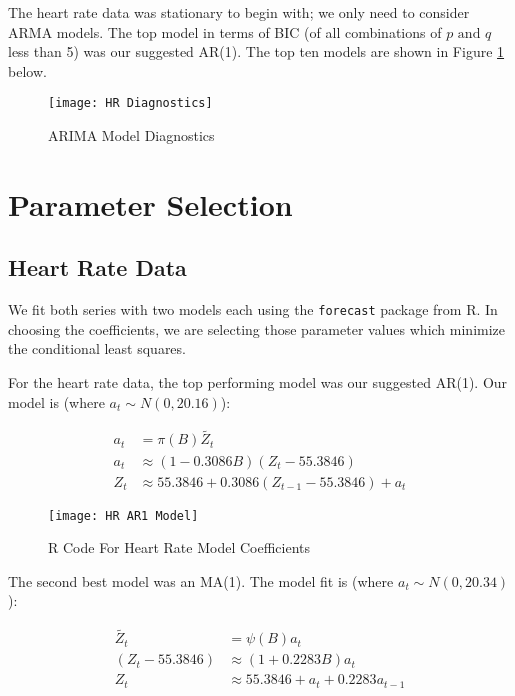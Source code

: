 \documentclass[12pt, letterpaper]{article}
\theoremstyle{definition}
\numberwithin{equation}{section}
\newcommand{\+}[1]{+_{\scalebox{.375}{#1}}}
\newcommand{\1}{\mathbbm{1}}
\begin{document}
The heart rate data was stationary to begin with; we only need to consider ARMA models. The top model in terms of BIC (of all combinations of $p \text{ and } q$ less than 5) was our suggested AR(1). The top ten models are shown in Figure \ref{Model Fit Weight} below.

\begin{figure}[H]
	\centering
	\texttt{[image: HR Diagnostics]}
	\caption{ARIMA Model Diagnostics}
	\label{Model Fit Weight}
\end{figure}


\newpage
\section{Parameter Selection}
\label{section.parameterselection}
\subsection{Heart Rate Data}
\label{subsection.hr}

We fit both series with two models each using the \texttt{forecast} package from R. In choosing the coefficients, we are selecting those parameter values which minimize the conditional least squares.
\vspace{\baselineskip}

For the heart rate data, the top performing model was our suggested AR(1). Our model is (where $a_t \sim N(0, 20.16)$):

\vspace{-0.5cm}
\begin{align}
	a_t&=\pi(B)\widetilde{Z_t}\\
	a_t&\approx(1-0.3086B)(Z_t-55.3846)\\
	Z_t&\approx55.3846+0.3086(Z_{t-1}-55.3846)+a_t
\end{align}

\vspace{-0.5cm}
\begin{figure}[H]
	\centering
	\texttt{[image: HR AR1 Model]}
	\caption{R Code For Heart Rate Model Coefficients}
	\label{HR AR1}
\end{figure}

The second best model was an MA(1). The model fit is (where $a_t \sim N(0,20.34)$):

\vspace{-0.5cm}
\begin{align}
	\widetilde{Z_t}&=\psi(B)a_t\\
	(Z_t-55.3846)&\approx(1+0.2283B)a_t\\
	Z_t&\approx55.3846+a_t+0.2283a_{t-1}
\end{align}
\end{document}
